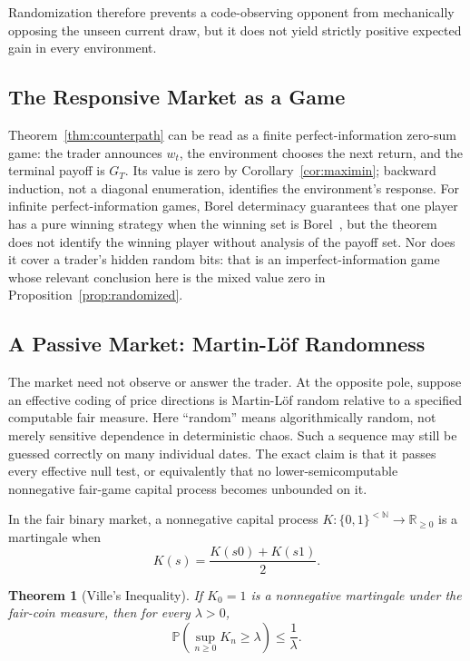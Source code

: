 \documentclass[aps,pra,reprint,superscriptaddress,amsmath,amssymb,floatfix]{revtex4-2}
\theoremstyle{plain}
\newtheorem{theorem}{Theorem}
\theoremstyle{definition}
\theoremstyle{remark}
\begin{document}
Randomization therefore prevents a code-observing opponent from mechanically
opposing the unseen current draw, but it does not yield strictly positive
expected gain in every environment.

\subsection{The Responsive Market as a Game}

Theorem~\ref{thm:counterpath} can be read as a finite perfect-information
zero-sum game: the trader announces \(w_t\), the environment chooses the next
return, and the terminal payoff is \(G_T\). Its value is zero by
Corollary~\ref{cor:maximin}; backward induction, not a diagonal enumeration,
identifies the environment's response. For infinite perfect-information games,
Borel determinacy guarantees that one player has a pure winning strategy when
the winning set is Borel~\cite{Martin1975}, but the theorem does not identify
the winning player without analysis of the payoff set. Nor does it cover a
trader's hidden random bits: that is an imperfect-information game whose
relevant conclusion here is the mixed value zero in
Proposition~\ref{prop:randomized}.

\subsection{A Passive Market: Martin-L\"of Randomness}

The market need not observe or answer the trader. At the opposite pole,
suppose an effective coding of price directions is Martin-L\"of random
relative to a specified computable fair measure. Here ``random'' means
algorithmically random, not merely sensitive dependence in deterministic
chaos. Such a sequence may still be guessed correctly on many individual
dates. The exact claim is that it passes every effective null test, or
equivalently that no lower-semicomputable nonnegative fair-game capital process
becomes unbounded on it.

In the fair binary market, a nonnegative capital process
\(K\colon\{0,1\}^{<\mathbb{N}}\to\mathbb{R}_{\geq0}\) is a martingale when
\begin{equation}
  K(s)=\frac{K(s0)+K(s1)}2.
  \label{eq:computablemartingale}
\end{equation}

\begin{theorem}[Ville's Inequality]
  \label{thm:ville}
  If \(K_0=1\) is a nonnegative martingale under the fair-coin measure, then
  for every \(\lambda>0\),
  \begin{equation}
    \mathbb{P}\!\left(\sup_{n\geq0}K_n\geq\lambda\right)
    \leq\frac1\lambda.
    \label{eq:ville}
  \end{equation}
\end{theorem}
\end{document}

